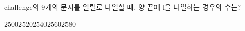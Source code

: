 challenge의 $9$개의 문자를 일렬로 나열할 때, 양 끝에 l을 나열하는 경우의 수는?
\begin{choices32}{$2500$}{$2520$}{$2540$}{$2560$}{$2580$}\end{choices32}
